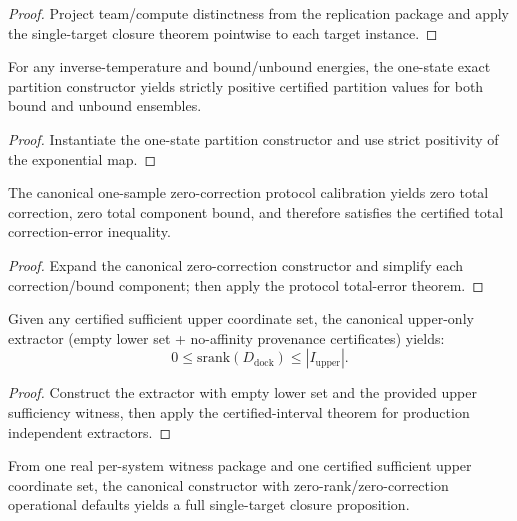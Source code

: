 \begin{proof}
Project team/compute distinctness from the replication package and apply the single-target closure theorem pointwise to each target instance.
\end{proof}

\begin{theorem}\label{thm:single-state-partition-positive-bundle}
For any inverse-temperature and bound/unbound energies, the one-state exact partition constructor yields strictly positive certified partition values for both bound and unbound ensembles.
\end{theorem}

\begin{proof}
Instantiate the one-state partition constructor and use strict positivity of the exponential map.
\end{proof}

\begin{theorem}\label{thm:zero-correction-calibration-bundle}
The canonical one-sample zero-correction protocol calibration yields zero total correction, zero total component bound, and therefore satisfies the certified total correction-error inequality.
\end{theorem}

\begin{proof}
Expand the canonical zero-correction constructor and simplify each correction/bound component; then apply the protocol total-error theorem.
\end{proof}

\begin{theorem}\label{thm:upper-only-independent-srank-extractor-bundle}
Given any certified sufficient upper coordinate set, the canonical upper-only extractor (empty lower set + no-affinity provenance certificates) yields:
\[
0 \le \mathrm{srank}(D_{\mathrm{dock}}) \le |I_{\mathrm{upper}}|.
\]
\end{theorem}

\begin{proof}
Construct the extractor with empty lower set and the provided upper sufficiency witness, then apply the certified-interval theorem for production independent extractors.
\end{proof}

\begin{theorem}\label{thm:single-target-zero-rank-concrete-closure-bundle}
From one real per-system witness package and one certified sufficient upper coordinate set, the canonical constructor with zero-rank/zero-correction operational defaults yields a full single-target closure proposition.
\end{theorem}

